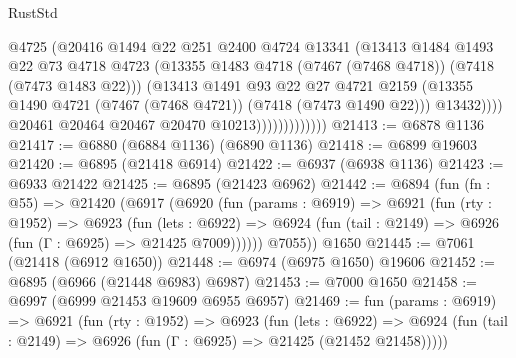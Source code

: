 \begin{lexlean}{RustStd}
\begin{coremodule}
                                @4725
                                (@20416
                                  @1494
                                  @22
                                  @251
                                  @2400
                                  @4724
                                  @13341
                                  (@13413
                                    @1484
                                    @1493
                                    @22
                                    @73
                                    @4718
                                    @4723
                                    (@13355
                                      @1483
                                      @4718
                                      (@7467 (@7468 @4718))
                                      (@7418 (@7473 @1483 @22)))
                                    (@13413
                                      @1491
                                      @93
                                      @22
                                      @27
                                      @4721
                                      @2159
                                      (@13355
                                        @1490
                                        @4721
                                        (@7467 (@7468 @4721))
                                        (@7418 (@7473 @1490 @22)))
                                      @13432))))
                              @20461
                              @20464
                              @20467
                              @20470
                              @10213)))))))))))))
@21413 := @6878 @1136
@21417 := @6880 (@6884 @1136) (@6890 @1136)
@21418 := @6899 @19603
@21420 := @6895 (@21418 @6914)
@21422 := @6937 (@6938 @1136)
@21423 := @6933 @21422
@21425 := @6895 (@21423 @6962)
@21442 := @6894
    (fun (fn : @55) =>
    @21420
      (@6917
        (@6920
          (fun (params : @6919) =>
          @6921
            (fun (rty : @1952) =>
            @6923
              (fun (lets : @6922) =>
              @6924 (fun (tail : @2149) => @6926 (fun (Γ : @6925) => @21425 @7009))))))
        @7055))
    @1650
@21445 := @7061 (@21418 (@6912 @1650))
@21448 := @6974 (@6975 @1650) @19606
@21452 := @6895 (@6966 (@21448 @6983) @6987)
@21453 := @7000 @1650
@21458 := @6997 (@6999 @21453 @19609 @6955 @6957)
@21469 := fun (params : @6919) =>
  @6921
    (fun (rty : @1952) =>
    @6923
      (fun (lets : @6922) =>
      @6924 (fun (tail : @2149) => @6926 (fun (Γ : @6925) => @21425 (@21452 @21458)))))

\end{coremodule}
\end{lexlean}
